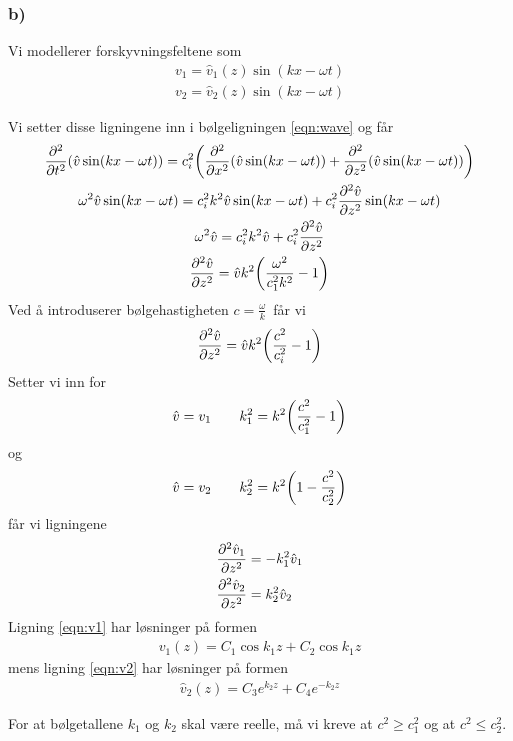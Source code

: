 \documentclass[12p,a4paper]{article}
\renewcommand{\exp}{e^}
\newcommand{\h}{\hat}
\renewcommand{\exp}{e^}
\begin{document}
\subsubsection*{b)}
Vi modellerer forskyvningsfeltene som
\begin{align}
    v_1 = \h v_1(z)\sin(kx - \omega t) \\
    v_2 = \h v_2(z)\sin(kx - \omega t)
\end{align}

Vi setter disse ligningene inn i bølgeligningen \ref{eqn:wave} og får
\begin{gather*}
    \pdv[2]{t}(\h v\sin(kx - \omega t)) = c_i^2\qty(\pdv[2]{x}(\h v\sin(kx - \omega t)) + \pdv[2]{z}(\h v\sin(kx - \omega t)) )\\
    \omega^2\h v\sin(kx - \omega t) = c_i^2k^2\h v\sin(kx - \omega t) + c_i^2\pdv[2]{\h v}{z} \sin(kx - \omega t)\\
    \omega^2\h v = c_i^2k^2\h v + c_i^2 \pdv[2]{\h v}{z}\\
    \pdv[2]{\h v}{z} = \h v k^2 \qty(\frac{\omega^2}{c_1^2k^2} - 1)
\end{gather*}
Ved å introduserer bølgehastigheten $c = \frac{\omega}{k}$ får vi
\begin{align}\label{eqn:v_hat}
    \pdv[2]{\h v}{z} = \h v k^2 \qty(\frac{c^2}{c_i^2} - 1)
\end{align}
Setter vi inn for
\begin{align*}
    \h v = v_1 \quad\quad k_1^2 = k^2\qty(\frac{c^2}{c_1^2} - 1)
\end{align*}
og
\begin{align*}
    \h v = v_2 \quad\quad k_2^2 = k^2\qty(1 - \frac{c^2}{c_2^2})
\end{align*}
får vi ligningene
\begin{align}\label{eqn:v1}
    \pdv[2]{\h v_1}{z} &= -k_1^2 \h v_1\\
\label{eqn:v2}
    \pdv[2]{\h v_2}{z} &= k_2^2 \h v_2
\end{align}
Ligning \ref{eqn:v1} har løsninger på formen
\begin{align*}
    v_1(z) = C_1\cos{k_1z} + C_2\cos{k_1z}
\end{align*}
mens ligning \ref{eqn:v2} har løsninger på formen
\begin{align*}
    \h v_2(z) = C_3\exp{k_2z} + C_4\exp{-k_2z}
\end{align*}

For at bølgetallene $k_1$ og $k_2$ skal være reelle, må vi kreve at $c^2 \geq c_1^2$ og at $c^2 \leq c_2^2$.
\end{document}
